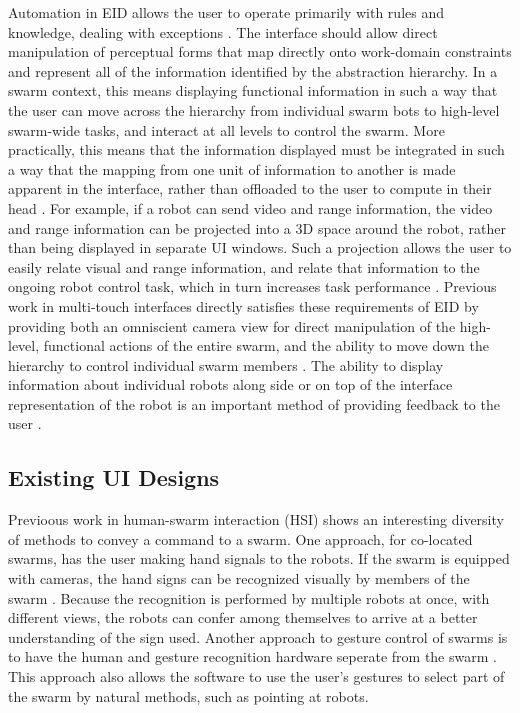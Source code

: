 Automation in EID allows the user to operate primarily with rules and knowledge, dealing with exceptions \citep{vicente2002ecological}.
The interface should allow direct manipulation of perceptual forms that map directly onto work-domain constraints and represent all of the information identified by the abstraction hierarchy. 
In a swarm context, this means displaying functional information in such a way that the user can move across the hierarchy from individual swarm bots to high-level swarm-wide tasks, and interact at all levels to control the swarm. 
More practically, this means that the information displayed must be integrated in such a way that the mapping from one unit of information to another is made apparent in the interface, rather than offloaded to the user to compute in their head \citep{yanco2004beyond}. 
For example, if a robot can send video and range information, the video and range information can be projected into a 3D space around the robot, rather than being displayed in separate UI windows.
Such a projection allows the user to easily relate visual and range information, and relate that information to the ongoing robot control task, which in turn increases task performance \citep{ricks2004ecological}.
Previous work in multi-touch interfaces directly satisfies these requirements of EID by providing both an omniscient camera view for direct manipulation of the high-level, functional actions of the entire swarm, and the ability to move down the hierarchy to control individual swarm members \citep{Micire:2009:ANG:1731903.1731912}.
The ability to display information about individual robots along side or on top of the interface representation of the robot is an important method of providing feedback to the user \citep{Kato:2009:MIC:1520340.1520500}. 

\subsection{Existing UI Designs}

Previoous work in human-swarm interaction (HSI) shows an interesting diversity of methods to convey a command to a swarm. 
One approach, for co-located swarms, has the user making hand signals to the robots. 
If the swarm is equipped with cameras, the hand signs can be recognized visually by members of the swarm \citep{nagi2014online, giusti2012human, nagi2014human}. 
Because the recognition is performed by multiple robots at once, with different views, the robots can confer among themselves to arrive at a better understanding of the sign used.
Another approach to gesture control of swarms is to have the human and gesture recognition hardware seperate from the swarm \citep{alonso2015gesture}.
This approach also allows the software to use the user's gestures to select part of the swarm by natural methods, such as pointing at robots. 

